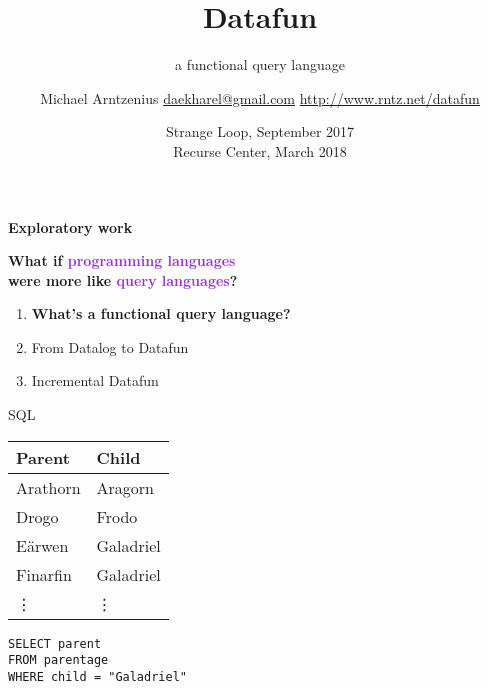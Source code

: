 \documentclass[xcolor=table,usenames,dvipsnames,svgnames]{beamer}
\title{Datafun}
\subtitle{a functional query language}
\author{Michael Arntzenius
  \newline\href{mailto:daekharel@gmail.com}{daekharel@gmail.com}
  \newline\url{http://www.rntz.net/datafun}}
\date{Strange Loop, September 2017\\
Recurse Center, March 2018}
\begin{document}
\maketitle


\begin{frame}\centering\LARGE\bf Exploratory work \end{frame}

\begin{frame}\LARGE \centering
  \textbf{What if \textcolor{DarkOrchid}{programming languages}\\
    were more like \textcolor{DarkOrchid}{query languages}?}


\end{frame}


\begin{frame}\Large
  \begin{enumerate}
    \itemsep 1.5em
  \item {\bf What's a functional query language?}
  \item From Datalog to Datafun
  \item Incremental Datafun
  \end{enumerate}
\end{frame}


\begin{frame}{SQL}\large
  \begin{minipage}{0.4\textwidth}
    \centering
    \begin{tabular}{l|l}
      \textbf{Parent} & \textbf{Child}\\\hline
      Arathorn & Aragorn\\
      Drogo & Frodo\\
      E\"arwen & Galadriel\\
      Finarfin & Galadriel\\
      \hfill\vdots & \hfill\vdots
    \end{tabular}
  \end{minipage}
  \hfill
  \begin{minipage}{0.51\textwidth}
    \texttt{SELECT parent\\FROM parentage\\WHERE child = "Galadriel"}
  \end{minipage}
\end{frame}
\end{document}
